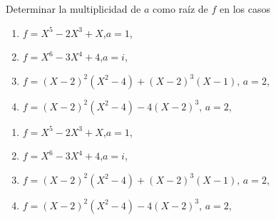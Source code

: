 \ejercicio
Determinar la multiplicidad de $a$ como raíz de $f$  en los casos
\begin{enumerate}[label=\roman*)] 
 \item $f = X^5 - 2X^3 + X$,\quad $a=1$,\\ 
 \item $f = X^6 - 3X^4 + 4$,\quad $a=i$,\\ 
 \item $f = (X-2)^2(X^2-4) + (X-2)^3(X-1)$, \quad $a=2$,\\ 
 \item $f = (X-2)^2(X^2-4) - 4(X-2)^3$, \quad $a=2$,\\ 
 \end{enumerate}

 \separadorCorto

\begin{enumerate}[label=\roman*)] 
 \item $f = X^5 - 2X^3 + X$,\quad $a=1$,\\ 

 \item $f = X^6 - 3X^4 + 4$,\quad $a=i$,\\ 

   \hacer
 \item $f = (X-2)^2(X^2-4) + (X-2)^3(X-1)$, \quad $a=2$,\\ 

 \item $f = (X-2)^2(X^2-4) - 4(X-2)^3$, \quad $a=2$,\\ 
 \end{enumerate}
